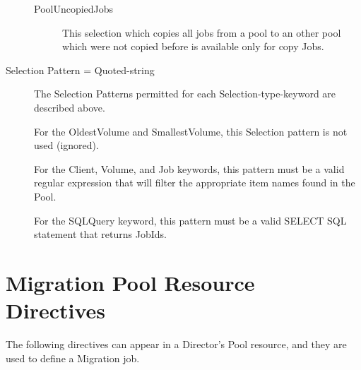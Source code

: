 \begin{description}
\begin{description}
  \item [PoolUncopiedJobs] This selection which copies all jobs from a pool
        to an other pool which were not copied before is available only for copy Jobs.

  \end{description}

\item [Selection Pattern = \lt{}Quoted-string\gt{}]
  The Selection Patterns permitted for each Selection-type-keyword are
  described above.  

  For the OldestVolume and SmallestVolume, this
  Selection pattern is not used (ignored).  

  For the Client, Volume, and Job
  keywords, this pattern must be a valid regular expression that will filter
  the appropriate item names found in the Pool.

  For the SQLQuery keyword, this pattern must be a valid SELECT SQL statement
  that returns JobIds.

\end{description}

\section{Migration Pool Resource Directives}

The following directives can appear in a Director's Pool resource, and they
are used to define a Migration job.

